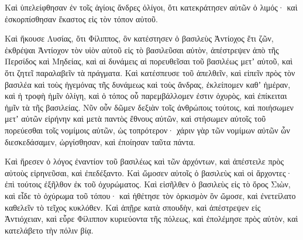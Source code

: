 {Καὶ ὑπελείφθησαν ἐν τοῖς ἁγίοις ἄνδρες ὀλίγοι, ὅτι κατεκράτησεν αὐτῶν ὁ λιμός· καὶ ἐσκορπίσθησαν ἕκαστος εἰς τὸν τόπον αὐτοῦ.
\par }{\PP {}Καὶ ἤκουσε Λυσίας, ὅτι Φίλιππος, ὃν κατέστησεν ὁ βασιλεὺς Ἀντίοχος ἔτι ζῶν, ἐκθρέψαι Ἀντίοχον τὸν υἱὸν αὐτοῦ εἰς τὸ βασιλεῦσαι αὐτὸν,
ἀπέστρεψεν ἀπὸ τῆς Περσίδος καὶ Μηδείας, καὶ αἱ δυνάμεις αἱ πορευθεῖσαι τοῦ βασιλέως μετʼ αὐτοῦ, καὶ ὅτι ζητεῖ παραλαβεῖν τὰ πράγματα.
Καὶ κατέσπευσε τοῦ ἀπελθεῖν, καὶ εἰπεῖν πρὸς τὸν βασιλέα καὶ τοὺς ἡγεμόνας τῆς δυνάμεως καὶ τοὺς ἄνδρας, ἐκλείπομεν καθʼ ἡμέραν, καὶ ἡ τροφὴ ἡμῖν ὀλίγη, καὶ ὁ τόπος οὗ παρεμβάλλομεν ἐστιν ὀχυρὸς, καὶ ἐπίκειται ἡμῖν τὰ τῆς βασιλείας.
Νῦν οὖν δῶμεν δεξιὰν τοῖς ἀνθρώποις τούτοις, καὶ ποιήσωμεν μετʼ αὐτῶν εἰρήνην καὶ μετὰ παντὸς ἔθνους αὐτῶν,
καὶ στήσωμεν αὐτοῖς τοῦ πορεύεσθαι τοῖς νομίμοις αὐτῶν, ὡς τοπρότερον· χάριν γὰρ τῶν νομίμων αὐτῶν ὧν διεσκεδάσαμεν, ὠργίσθησαν, καὶ ἐποίησαν ταῦτα πάντα.
\par }{\PP {}Καὶ ἤρεσεν ὁ λόγος ἐναντίον τοῦ βασιλέως καὶ τῶν ἀρχόντων, καὶ ἀπέστειλε πρὸς αὐτοὺς εἰρηνεῦσαι, καὶ ἐπεδέξαντο.
Καὶ ὤμοσεν αὐτοῖς ὁ βασιλεὺς καὶ οἱ ἄρχοντες· ἐπὶ τούτοις ἐξῆλθον ἐκ τοῦ ὀχυρώματος.
Καὶ εἰσῆλθεν ὁ βασιλεὺς εἰς τὸ ὄρος Σιὼν, καὶ εἶδε τὸ ὀχύρωμα τοῦ τόπου· καὶ ἠθέτησε τὸν ὁρκισμὸν ὃν ὤμοσε, καὶ ἐνετείλατο καθελεῖν τὸ τεῖχος κυκλόθεν.
Καὶ ἀπῇρε κατὰ σπουδὴν, καὶ ἀπέστρεψεν εἰς Ἀντιόχειαν, καὶ εὗρε Φίλιππον κυριεύοντα τῆς πόλεως, καὶ ἐπολέμησε πρὸς αὐτὸν, καὶ κατελάβετο τὴν πόλιν βίᾳ.

}
